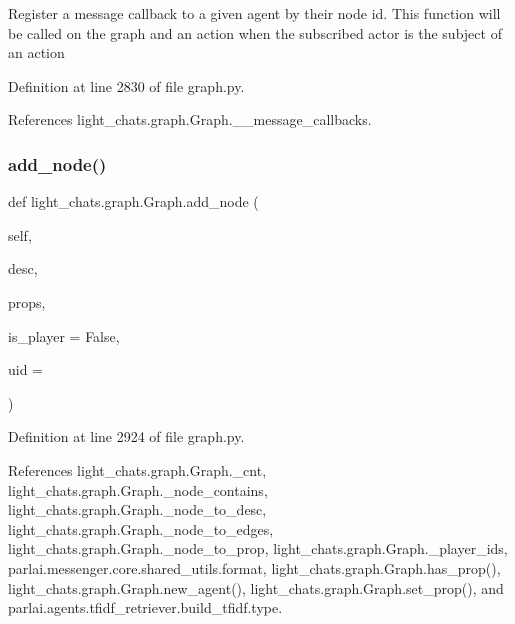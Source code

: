 \begin{DoxyVerb}Register a message callback to a given agent by their node id. This
function will be called on the graph and an action when the subscribed
actor is the subject of an action
\end{DoxyVerb}
 

Definition at line 2830 of file graph.\+py.



References light\+\_\+chats.\+graph.\+Graph.\+\_\+\+\_\+message\+\_\+callbacks.

\mbox{\label{classlight__chats_1_1graph_1_1Graph_a5356cdaf2e48b3a128773c70957cb38a}} 
\subsubsection{\texorpdfstring{add\+\_\+node()}{add\_node()}}
{\footnotesize\ttfamily def light\+\_\+chats.\+graph.\+Graph.\+add\+\_\+node (\begin{DoxyParamCaption}\item[{}]{self,  }\item[{}]{desc,  }\item[{}]{props,  }\item[{}]{is\+\_\+player = {\ttfamily False},  }\item[{}]{uid = {\ttfamily \textquotesingle{}\textquotesingle{}} }\end{DoxyParamCaption})}



Definition at line 2924 of file graph.\+py.



References light\+\_\+chats.\+graph.\+Graph.\+\_\+cnt, light\+\_\+chats.\+graph.\+Graph.\+\_\+node\+\_\+contains, light\+\_\+chats.\+graph.\+Graph.\+\_\+node\+\_\+to\+\_\+desc, light\+\_\+chats.\+graph.\+Graph.\+\_\+node\+\_\+to\+\_\+edges, light\+\_\+chats.\+graph.\+Graph.\+\_\+node\+\_\+to\+\_\+prop, light\+\_\+chats.\+graph.\+Graph.\+\_\+player\+\_\+ids, parlai.\+messenger.\+core.\+shared\+\_\+utils.\+format, light\+\_\+chats.\+graph.\+Graph.\+has\+\_\+prop(), light\+\_\+chats.\+graph.\+Graph.\+new\+\_\+agent(), light\+\_\+chats.\+graph.\+Graph.\+set\+\_\+prop(), and parlai.\+agents.\+tfidf\+\_\+retriever.\+build\+\_\+tfidf.\+type.



